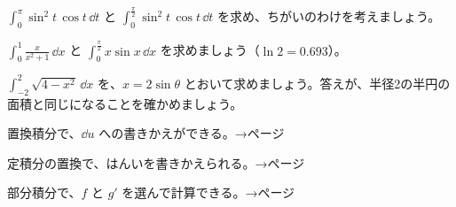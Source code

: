 \bkproblem $\displaystyle\int_0^{\pi}\sin^2t\,\cos t\,\dd t$ と $\displaystyle\int_0^{\frac{\pi}{2}}\sin^2t\,\cos t\,\dd t$ を求め、ちがいのわけを考えましょう。

\bkproblem $\displaystyle\int_0^1\frac{x}{x^2+1}\,\dd x$ と $\displaystyle\int_0^{\frac{\pi}{2}}x\sin x\,\dd x$ を求めましょう（$\ln2=0.693$）。

\bkproblem $\displaystyle\int_{-2}^{2}\sqrt{4-x^2}\,\dd x$ を、$x=2\sin\theta$ とおいて求めましょう。答えが、半径2の半円の面積と同じになることを確かめましょう。

\begin{furikaeri}
\begin{checklist}
\item 置換積分で、$\dd u$ への書きかえができる。\hfill{\footnotesize\sffamily\color{bkTheme}→\pageref{bk:5-16:chikan}ページ}
\item 定積分の置換で、はんいを書きかえられる。\hfill{\footnotesize\sffamily\color{bkTheme}→\pageref{bk:5-16:hanni}ページ}
\item 部分積分で、$f$ と $g'$ を選んで計算できる。\hfill{\footnotesize\sffamily\color{bkTheme}→\pageref{bk:5-16:bubun}ページ}
\end{checklist}
\end{furikaeri}

